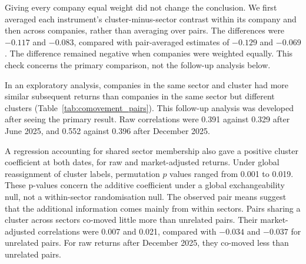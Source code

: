 Giving every company equal weight did not change the conclusion. We first averaged each instrument's cluster-minus-sector contrast within its company and then across companies, rather than averaging over pairs. The differences were $-0.117$ and $-0.083$, compared with pair-averaged estimates of $-0.129$ and $-0.069$. The difference remained negative when companies were weighted equally. This check concerns the primary comparison, not the follow-up analysis below.

\begin{table}[htbp]
\centering\caption{Mean forward correlation of daily returns between peers over the six months after each formation date. $\Delta\rho$ is cluster peers minus sector peers; the interval is from a ten-day block bootstrap. Market-adjusted returns are residuals from a regression on the Top 40 Index.}\label{tab:comovement}
\footnotesize

\end{table}

In an exploratory analysis, companies in the same sector and cluster had more similar subsequent returns than companies in the same sector but different clusters (Table~\ref{tab:comovement_pairs}). This follow-up analysis was developed after seeing the primary result. Raw correlations were 0.391 against 0.329 after June 2025, and 0.552 against 0.396 after December 2025.

A regression accounting for shared sector membership also gave a positive cluster coefficient at both dates, for raw and market-adjusted returns. Under global reassignment of cluster labels, permutation $p$ values ranged from 0.001 to 0.019. These p-values concern the additive coefficient under a global exchangeability null, not a within-sector randomisation null. The observed pair means suggest that the additional information comes mainly from within sectors. Pairs sharing a cluster across sectors co-moved little more than unrelated pairs. Their market-adjusted correlations were 0.007 and 0.021, compared with $-0.034$ and $-0.037$ for unrelated pairs. For raw returns after December 2025, they co-moved less than unrelated pairs.

\begin{table}[htbp]
\centering\caption{Mean forward correlation by type of pair, with the number of pairs after June and December 2025. The cluster coefficient is from a regression of pairwise correlation on shared-sector and shared-cluster indicators. Permutation $p$-values use 5,000 random reassignments of cluster labels across instruments, preserving cluster sizes.}\label{tab:comovement_pairs}
\footnotesize

\end{table}

